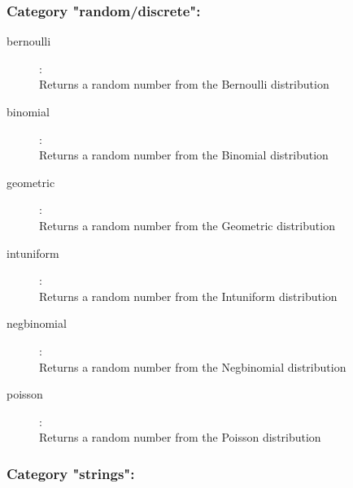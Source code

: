 \subsubsection{Category "random/discrete":}

\begin{description}
\item[bernoulli]:  \\
    Returns a random number from the Bernoulli distribution
\item[binomial]:  \\
    Returns a random number from the Binomial distribution
\item[geometric]:  \\
    Returns a random number from the Geometric distribution
\item[intuniform]:  \\
    Returns a random number from the Intuniform distribution
\item[negbinomial]:  \\
    Returns a random number from the Negbinomial distribution
\item[poisson]:  \\
    Returns a random number from the Poisson distribution

\end{description}

\subsubsection{Category "strings":}

